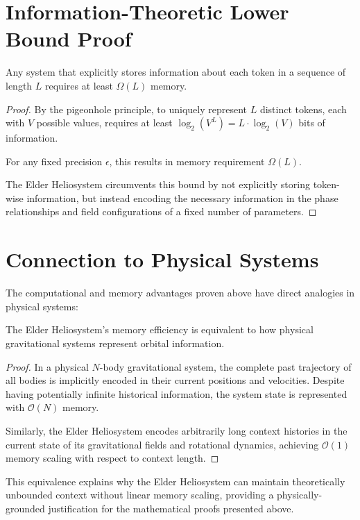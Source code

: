 \section{Information-Theoretic Lower Bound Proof}

\begin{theorem}
Any system that explicitly stores information about each token in a sequence of length $L$ requires at least $\Omega(L)$ memory.
\end{theorem}

\begin{proof}
By the pigeonhole principle, to uniquely represent $L$ distinct tokens, each with $V$ possible values, requires at least $\log_2(V^L) = L \cdot \log_2(V)$ bits of information.

For any fixed precision $\epsilon$, this results in memory requirement $\Omega(L)$.

The Elder Heliosystem circumvents this bound by not explicitly storing token-wise information, but instead encoding the necessary information in the phase relationships and field configurations of a fixed number of parameters.
\end{proof}

\section{Connection to Physical Systems}

The computational and memory advantages proven above have direct analogies in physical systems:

\begin{theorem}
The Elder Heliosystem's memory efficiency is equivalent to how physical gravitational systems represent orbital information.
\end{theorem}

\begin{proof}
In a physical $N$-body gravitational system, the complete past trajectory of all bodies is implicitly encoded in their current positions and velocities. Despite having potentially infinite historical information, the system state is represented with $\mathcal{O}(N)$ memory.

Similarly, the Elder Heliosystem encodes arbitrarily long context histories in the current state of its gravitational fields and rotational dynamics, achieving $\mathcal{O}(1)$ memory scaling with respect to context length.
\end{proof}

This equivalence explains why the Elder Heliosystem can maintain theoretically unbounded context without linear memory scaling, providing a physically-grounded justification for the mathematical proofs presented above.